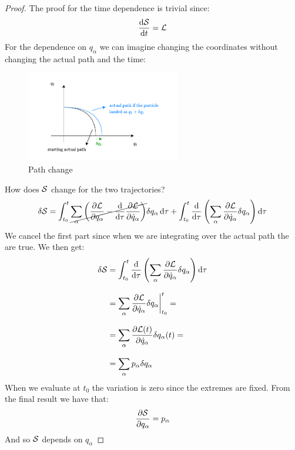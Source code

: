 \begin{proof}
  The proof for the time dependence is trivial since:
  \begin{equation}
    \dv{\action}{t} = \lagr
  \end{equation}
  For the dependence on $q_{\alpha}$ we can imagine changing the coordinates without changing the actual path and the time:
  \begin{figure}[H]
    \centering
    \includegraphics[width=0.6\textwidth]{res/svg/path_change_hamjac.drawio}
    \caption{Path change}
\end{figure}
How does $\mathcal{S}$ change for the two trajectories?
\begin{equation}
  \delta \action = \int_{t_0}^{t}\cancel{\bigsum_{\alpha}\brackets{\pdv{\lagr}{q_{\alpha}}-\dv{}{\tau}\pdv{\lagr}{\dot{q}_{\alpha}}}}\delta q_{\alpha} \dd{\tau} + \int_{t_0}^{t} \dv{}{\tau} \brackets{\bigsum_{\alpha} \pdv{\lagr}{\dot{q}_{\alpha}}\delta q_{\alpha}} \dd{\tau}
\end{equation}
We cancel the first part since when we are integrating over the actual path the \eleref\;are true. We then get:
\begin{equation}
  \begin{split}
    \delta \action &= \int_{t_0}^{t}\dv{}{\tau}\brackets{\bigsum_{\alpha} \pdv{\lagr}{\dot{q}_{\alpha}}\delta q_{\alpha}} \dd{\tau}\\[8pt]
    &= \bigsum_{\alpha} \pdv{\lagr}{\dot{q}_{\alpha}}\delta q_{\alpha}\bigg|_{t_0}^t =\\[8pt]
    &= \bigsum_{\alpha} \pdv{\lagr(t)}{\dot{q}_{\alpha}}\delta q_{\alpha}(t) =\\[8pt]
    &= \bigsum_{\alpha} p_{\alpha} \delta {q_{\alpha}}
  \end{split}
\end{equation}
When we evaluate at $t_0$ the variation is zero since the extremes are fixed. From the final result we have that:
\begin{equation}
  \pdv{\action}{q_{\alpha}} = p_{\alpha}
\end{equation}
And so $\mathcal{S}$ depends on $q_{\alpha}$
\end{proof}
